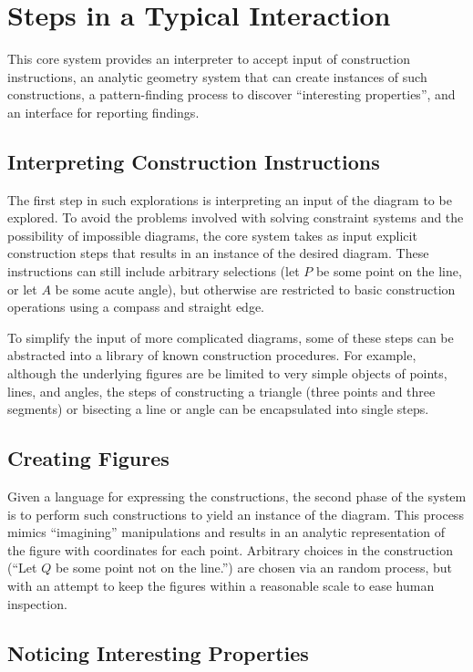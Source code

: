 \section{Steps in a Typical Interaction}

This core system provides an interpreter to accept input of
construction instructions, an analytic geometry system that can create
instances of such constructions, a pattern-finding process to discover
``interesting properties'', and an interface for reporting findings.

\subsection{Interpreting Construction Instructions}

The first step in such explorations is interpreting an input of the
diagram to be explored.  To avoid the problems involved with solving
constraint systems and the possibility of impossible diagrams, the
core system takes as input explicit construction steps that results in
an instance of the desired diagram.  These instructions can still
include arbitrary selections (let $P$ be some point on the line, or
let $A$ be some acute angle), but otherwise are restricted to basic
construction operations using a compass and straight edge.

To simplify the input of more complicated diagrams, some of these
steps can be abstracted into a library of known construction
procedures.  For example, although the underlying figures are be
limited to very simple objects of points, lines, and angles, the steps
of constructing a triangle (three points and three segments) or
bisecting a line or angle can be encapsulated into single steps.

\subsection{Creating Figures}

Given a language for expressing the constructions, the second phase of
the system is to perform such constructions to yield an instance of
the diagram.  This process mimics ``imagining'' manipulations and
results in an analytic representation of the figure with coordinates
for each point.  Arbitrary choices in the construction (``Let $Q$ be
some point not on the line.'') are chosen via an random process, but
with an attempt to keep the figures within a reasonable scale to ease
human inspection.

\subsection{Noticing Interesting Properties}
\label{sec:interest}

